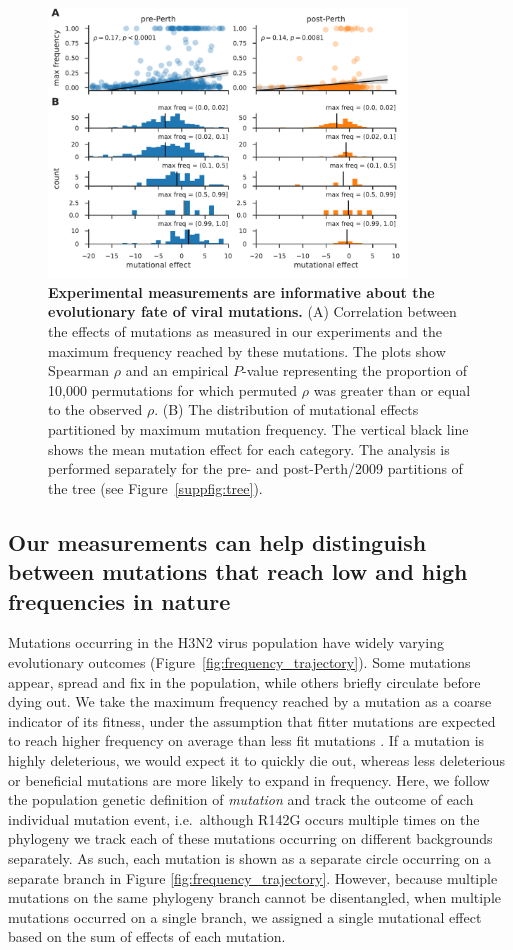 \documentclass[9pt,twocolumn,twoside]{pnas-new}
\begin{document}
\begin{figure}[ht]
\centering
\includegraphics[width=0.85\textwidth]{figs/muteffect_by_maxfreq.pdf}
\caption{\label{fig:muteffect_maxfreq}
{\bf Experimental measurements are informative about the evolutionary fate of viral mutations.}
(A) Correlation between the effects of mutations as measured in our experiments and the maximum frequency reached by these mutations.
The plots show Spearman $\rho$ and an empirical $P$-value representing the proportion of 10,000 permutations for which permuted $\rho$ was greater than or equal to the observed $\rho$.
(B) The distribution of mutational effects partitioned by maximum mutation frequency.
The vertical black line shows the mean mutation effect for each category.
The analysis is performed separately for the pre- and post-Perth/2009 partitions of the tree (see Figure~\ref{suppfig:tree}).
}
\end{figure}

\subsection*{Our measurements can help distinguish between mutations that reach low and high frequencies in nature}
Mutations occurring in the H3N2 virus population have widely varying evolutionary outcomes (Figure~\ref{fig:frequency_trajectory}).
Some mutations appear, spread and fix in the population, while others briefly circulate before dying out.
We take the maximum frequency reached by a mutation as a coarse indicator of its fitness, under the assumption that fitter mutations are expected to reach higher frequency on average than less fit mutations \cite{ewens2012mathematical}.
If a mutation is highly deleterious, we would expect it to quickly die out, whereas less deleterious or beneficial mutations are more likely to expand in frequency.
Here, we follow the population genetic definition of \textit{mutation} and track the outcome of each individual mutation event, i.e.\ although R142G occurs multiple times on the phylogeny we track each of these mutations occurring on different backgrounds separately.
As such, each mutation is shown as a separate circle occurring on a separate branch in Figure \ref{fig:frequency_trajectory}.
However, because multiple mutations on the same phylogeny branch cannot be disentangled, when multiple mutations occurred on a single branch, we assigned a single mutational effect based on the sum of effects of each mutation.
\end{document}

